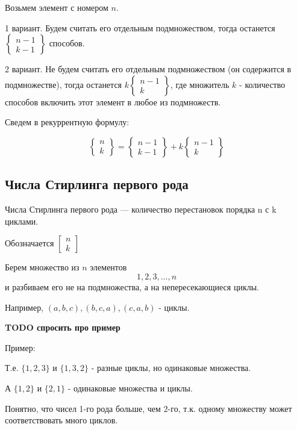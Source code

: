 Возьмем элемент с номером $ n $.

1 вариант. Будем считать его отдельным подмножеством, тогда останется
$\begin{Bmatrix}
n-1 \\
k-1
\end{Bmatrix}$ способов.

2 вариант. Не будем считать его отдельным подмножеством 
(он содержится в подмножестве), тогда останется
$k \begin{Bmatrix}
n-1 \\
k
\end{Bmatrix}$, где множитель $ k $ - количество способов включить 
этот элемент в любое из подмножеств.

Сведем в рекуррентную формулу:

$$
\begin{Bmatrix}
n \\
k
\end{Bmatrix} = 
\begin{Bmatrix}
n-1 \\
k-1
\end{Bmatrix} +
k \begin{Bmatrix}
n-1 \\
k
\end{Bmatrix}
$$

\subsection{Числа Стирлинга первого рода}

Числа Стирлинга первого рода --- количество перестановок порядка n с k циклами.

Обозначается
$\begin{bmatrix}
n \\
k
\end{bmatrix}$

Берем множество из $ n $ элементов 
$$
1,2,3,\ldots,n
$$
и разбиваем его не на подмножества, а на непересекающиеся циклы.

Например,
$(a,b,c),(b,c,a),(c,a,b)$ - циклы.

\textbf{TODO спросить про пример}

Пример:

Т.е. $ \{1,2,3\} $ и $ \{1,3,2\} $ - разные циклы, но одинаковые множества.

А $ \{1,2\} $ и $ \{2,1\} $ - одинаковые множества и циклы.

Понятно, что чисел 1-го рода больше, чем 2-го, т.к. одному множеству 
может соответствовать много циклов.

